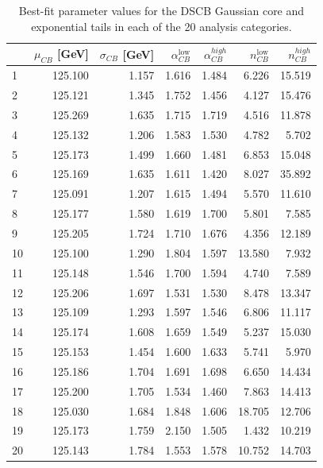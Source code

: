 \begin{table}[!htp]
\begin{center}
\begin{tabular}{lrrrrrr}
        \hline
        {} & $\mu_{CB}$ [GeV] & $\sigma_{CB}$ [GeV] &$\alpha_{CB}^\text{low}$ & $\alpha_{CB}^{high}$ & $n_{CB}^\text{low}$ & $n_{CB}^{high}$ \\
        \hline
        1 & 125.100 & 1.157 & 1.616 & 1.484 & 6.226 & 15.519 \\
        2 & 125.121 & 1.345 & 1.752 & 1.456 & 4.127 & 15.476 \\
        3 & 125.269 & 1.635 & 1.715 & 1.719 & 4.516 & 11.878 \\
        4 & 125.132 & 1.206 & 1.583 & 1.530 & 4.782 & 5.702 \\
        5 & 125.173 & 1.499 & 1.660 & 1.481 & 6.853 & 15.048 \\
        6 & 125.169 & 1.635 & 1.611 & 1.420 & 8.027 & 35.892 \\
        7 & 125.091 & 1.207 & 1.615 & 1.494 & 5.570 & 11.610 \\
        8 & 125.177 & 1.580 & 1.619 & 1.700 & 5.801 & 7.585 \\
        9 & 125.205 & 1.724 & 1.710 & 1.676 & 4.356 & 12.189 \\
        10 & 125.100 & 1.290 & 1.804 & 1.597 & 13.580 & 7.932 \\
        11 & 125.148 & 1.546 & 1.700 & 1.594 & 4.740 & 7.589 \\
        12 & 125.206 & 1.697 & 1.531 & 1.530 & 8.478 & 13.347\\ \hline
        13 & 125.109 & 1.293 & 1.597& 1.546 & 6.806 & 11.117\\
        14 & 125.174 & 1.608 & 1.659 & 1.549 & 5.237 & 15.030\\
        15 & 125.153 & 1.454 & 1.600 & 1.633 & 5.741 & 5.970\\
        16 & 125.186 & 1.704 & 1.691 & 1.698 & 6.650 & 14.434 \\
        17 & 125.200 & 1.705 & 1.534 & 1.460 & 7.863 & 14.413 \\
        18 & 125.030 & 1.684 & 1.848 & 1.606 & 18.705 & 12.706 \\
        19 & 125.173 & 1.759 & 2.150 & 1.505 & 1.432 & 10.219\\
        20 & 125.143 & 1.784 & 1.553 & 1.578 & 10.752 & 14.703\\
        \hline
\end{tabular}
\caption{Best-fit parameter values for the DSCB Gaussian core and exponential tails in each of the 20 analysis categories.}
\label{tab:sig_param}
\end{center}
\end{table}



